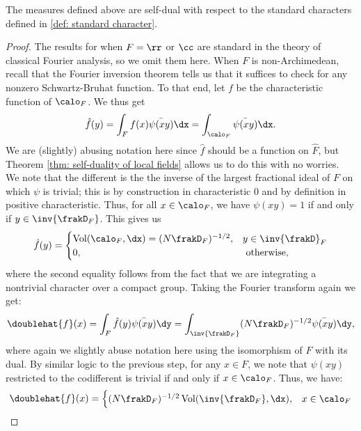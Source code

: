 \documentclass[11pt, x11names, openany]{book}
\begin{document}
\begin{prop}
    \label{prop: self-dual local measures}
The measures defined above are self-dual with respect to the standard characters defined in \ref{def: standard character}.
\end{prop}
\begin{proof}
The results for when $F = \rr$ or $\cc$ are standard in the theory of classical Fourier analysis, so we omit them here. When $F$ is non-Archimedean, recall that the Fourier inversion theorem tells us that it suffices to check for any nonzero Schwartz-Bruhat function. To that end, let $f$ be the characteristic function of $\calo_F$. We thus get
\begin{equation*}
    \hat{f}(y) = \int_F f(x) \bar{\psi(xy)} \dx = \int_{\calo_F} \bar{\psi(xy)} \dx.
\end{equation*}
We are (slightly) abusing notation here since $\hat{f}$ should be a function on $\hat{F}$, but Theorem \ref{thm: self-duality of local fields} allows us to do this with no worries.\\
We note that the different is the the inverse of the largest fractional ideal of $F$ on which $\psi$ is trivial; this is by construction in characteristic 0 and by definition in positive characteristic. Thus, for all $x \in \calo_F$, we have $\psi(xy) = 1$ if and only if $y \in \inv{\frakD_F}$. This gives us
\begin{equation*}
    \hat{f}(y) = \begin{cases}
    \vol(\calo_F, \dx) = (N\frakD_F)^{-1/2}, & y \in \inv{\frakD}_F\\
    0, & \text{ otherwise},
    \end{cases}
\end{equation*}
where the second equality follows from the fact that we are integrating a nontrivial character over a compact group. Taking the Fourier transform again we get:
\begin{equation*}
    \doublehat{f}(x) = \int_F \hat{f}(y) \bar{\psi(xy)} \dy = \int_{\inv{\frakD_F}} (N\frakD_F)^{-1/2} \bar{\psi(xy)} \dy,
\end{equation*}
where again we slightly abuse notation here using the isomorphism of $F$ with its dual. By similar logic to the previous step, for any $x \in F$, we note that $\psi(xy)$ restricted to the codifferent is trivial if and only if $x \in \calo_F$. Thus, we have:
\begin{equation*}
    \doublehat{f}(x) = \begin{cases}
    (N\frakD_F)^{-1/2} \vol(\inv{\frakD_F}, \dx), & x \in \calo_F\\

\end{cases}
\end{equation*}
\end{proof}
\end{document}
